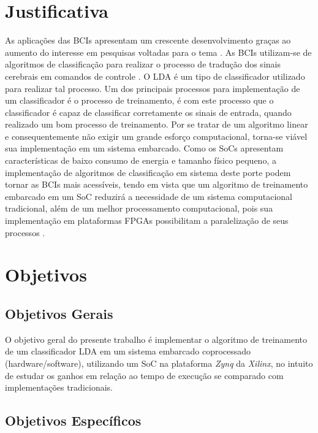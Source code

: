 \section{Justificativa}
As aplicações das BCIs apresentam um crescente desenvolvimento  graças ao aumento do interesse em pesquisas voltadas para o tema \cite{BCICompetition}. As BCIs utilizam-se de algoritmos de classificação para realizar o processo de tradução dos sinais cerebrais em comandos de controle \cite{MasonAndBirch}. O LDA é um tipo de classificador utilizado para realizar tal processo. Um dos principais processos para implementação de um classificador é o processo de treinamento, é com este processo que o classificador é capaz de classificar corretamente os sinais de entrada, quando realizado um bom processo de treinamento\cite{F.Lotte}. Por se tratar de um algoritmo linear e consequentemente não exigir um grande esforço computacional, torna-se viável sua implementação em um sistema embarcado. Como os SoCs apresentam características de baixo consumo de energia e tamanho físico pequeno, a implementação de algoritmos de classificação em sistema deste porte podem tornar as BCIs mais acessíveis, tendo em vista que um algoritmo de treinamento embarcado em um SoC reduzirá a necessidade de um sistema computacional tradicional, além de um melhor processamento computacional, pois sua implementação em plataformas FPGAs possibilitam a paralelização de seus processos \cite{zynqBook}.

\section{Objetivos}

\subsection{Objetivos Gerais}

	O objetivo geral do presente trabalho é implementar o algoritmo de treinamento de um classificador LDA em um sistema embarcado coprocessado (hardware/software), utilizando um SoC na plataforma \textit{Zynq} da \textit{Xilinx}, no intuito de estudar os ganhos em relação ao tempo de execução se comparado com implementações tradicionais.

\subsection{Objetivos Específicos}

